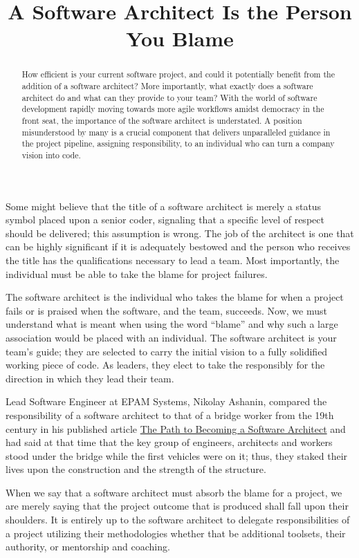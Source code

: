 \documentclass{main}
\title{A Software Architect Is the Person You Blame}
\begin{document}
\begin{abstract}
How efficient is your current software project, and could it potentially benefit
from the addition of a software architect? More importantly, what exactly
does a software architect do and what can they provide to your team?
With the world of software development rapidly moving towards more agile workflows
amidst democracy in the front seat, the importance of the software architect
is understated. A position misunderstood by many is a crucial component that delivers
unparalleled guidance in the project pipeline, assigning responsibility, to an
individual who can turn a company vision into code.
\end{abstract}

Some might believe that the title of a software architect is merely a status
symbol placed upon a senior coder, signaling that a specific level of respect
should be delivered; this assumption is wrong. The job of the architect is one
that can be highly significant if it is adequately bestowed and the person who
receives the title has the qualifications necessary to lead a team. Most
importantly, the individual must be able to take the blame for project failures.

The software architect is the individual who takes the blame for when a project
fails or is praised when the software, and the team, succeeds. Now, we must
understand what is meant when using the word ``blame'' and why such a large
association would be placed with an individual. The software architect is your
team's guide; they are selected to carry the initial vision to a fully
solidified working piece of code. As leaders, they elect to take the responsibly
for the direction in which they lead their team.

Lead Software Engineer at EPAM Systems, Nikolay Ashanin, compared the
responsibility of a software architect to that of a bridge worker from the 19th
century in his published article
\href{https://medium.com/@nvashanin/the-path-to-becoming-a-software-architect-de53f1cb310a}{The Path to Becoming a Software Architect} and
had said at that time that the key group of engineers, architects and workers
stood under the bridge while the first vehicles were on it; thus, they staked
their lives upon the construction and the strength of the structure.

When we say that a software architect must absorb the blame for a project, we
are merely saying that the project outcome that is produced shall fall upon
their shoulders. It is entirely up to the software architect to delegate
responsibilities of a project utilizing their methodologies whether that be
additional toolsets, their authority, or mentorship and coaching.
\end{document}

